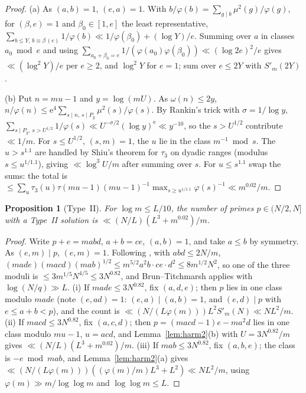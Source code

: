 \documentclass[10pt,reqno]{amsart}
\newtheorem{proposition}[theorem]{Proposition}
\theoremstyle{definition}
\newcommand{\e}{\mathrm e}
\begin{document}
\begin{proof}
(a) As $(a,b)=1$, $(e,a)=1$.  With $b/\varphi(b)=\sum_{g\mid b}\mu^2(g)/\varphi(g)$,
for $(\beta,e)=1$ and $\beta_0\in[1,e]$ the least representative,
$\sum_{b\leq Y,\,b\equiv\beta\,(e)}1/\varphi(b)\ll1/\varphi(\beta_0)+(\log Y)/e$.
Summing over $a$ in classes $a_0\bmod e$ and using
$\sum_{a_0+\beta_0=e}1/(\varphi(a_0)\varphi(\beta_0))\ll(\log2e)^2/e$
gives $\ll(\log^2Y)/e$ per $e\geq2$, and $\log^2Y$ for $e=1$; sum over
$e\leq2Y$ with $S'_m(2Y)$. %

(b) Put $n=mu-1$ and $y=\log(mU)$.  As $\omega(n)\leq2y$,
$n/\varphi(n)\leq\e^4\sum_{s\mid n,\,s\mid P_y}\mu^2(s)/\varphi(s)$.  By
Rankin's trick with $\sigma=1/\log y$,
$\sum_{s\mid P_y,\,s>U^{1/2}}1/\varphi(s)\ll U^{-\sigma/2}(\log y)^{\e}\ll y^{-10}$,
so the $s>U^{1/2}$ contribute $\ll1/m$.  For $s\leq U^{1/2}$, $(s,m)=1$,
the $u$ lie in the class $m^{-1}\bmod s$.  The $u>s^{1.1}$ are handled by
Shiu's theorem for $\tau_3$ on dyadic ranges (modulus $s\leq u^{1/1.1}$),
giving $\ll\log^3U/m$ after summing over $s$.  For $u\leq s^{1.1}$ swap
the sums: the total is
$\leq\sum_u\tau_3(u)\tau(mu-1)(mu-1)^{-1}\max_{s\geq u^{1/1.1}}\varphi(s)^{-1}
\ll m^{0.02}/m$.
\end{proof}

\begin{proposition}[Type~II]\label{prop:typeII}
For $\log m\leq L/10$, the number of primes $p\in(N/2,N]$ with a Type~II
solution is $\ll(N/L)(L^3+m^{0.02})/m$.
\end{proposition}

\begin{proof}
Write $p+e=mabd$, $a+b=ce$, $(a,b)=1$, and take $a\leq b$ by symmetry.
As $(e,m)\mid p$, $(e,m)=1$.  Following \cite[\S9]{ET}, with $abd\leq2N/m$,
$(made)(macd)(mab)^{1/2}\leq m^{5/2}a^2b\cdot ce\cdot d^2\leq8m^{1/2}N^2$,
so one of the three moduli is $\leq3m^{1/5}N^{4/5}\leq3N^{0.82}$, and
Brun--Titchmarsh applies with $\log(N/q)\gg L$.  (i) If
$made\leq3N^{0.82}$, fix $(a,d,e)$; then $p$ lies in one class modulo
$made$ (note $(e,ad)=1$: $(e,a)\mid(a,b)=1$, and $(e,d)\mid p$ with
$e\leq a+b<p$), %
 and the count is $\ll(N/(L\varphi(m)))L^2S'_m(N)\ll NL^2/m$.
(ii) If $macd\leq3N^{0.82}$, fix $(a,c,d)$; then
$p=(macd-1)e-ma^2d$ lies in one class modulo $mu-1$, $u=acd$, and
Lemma~\ref{lem:harm2}(b) with $U=3N^{0.82}/m$ gives
$\ll(N/L)(L^3+m^{0.02})/m$.  (iii) If $mab\leq3N^{0.82}$, fix $(a,b,e)$;
the class is $-e\bmod mab$, and Lemma~\ref{lem:harm2}(a) gives
$\ll(N/(L\varphi(m)))((\varphi(m)/m)L^3+L^2)\ll NL^2/m$, using
$\varphi(m)\gg m/\log\log m$ and $\log\log m\leq L$.
\end{proof}
\end{document}
